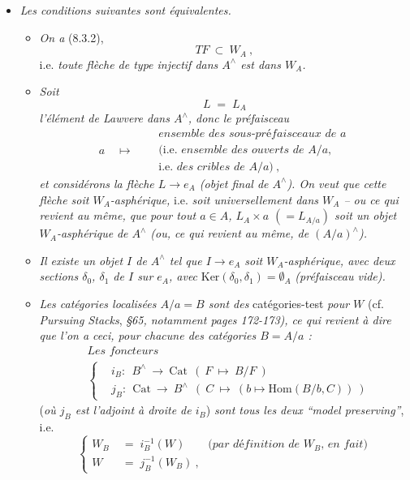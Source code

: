 \documentclass[11pt]{article}
\newcommand{\msp}[1]{\marginpar{\footnotesize [#1]}}
\newcommand{\Cat}{\mathrm{Cat}}
\newcommand{\chap}{^{\wedge}}
\begin{document}
\begin{itemize}[leftmargin=*]
\item[1$^\circ$)] \textit{Les conditions suivantes sont équivalentes.}
\begin{itemize}[leftmargin=*]
\item[a)] \textit{On a} (8.3.2),
\[
TF\ \subset\ W_A\ ,
\]
i.e. \textit{toute flèche de type injectif dans $A\chap$ est dans $W_A$.}
\item[b)] \textit{Soit}
\[
L \;=\; L_A
\tag*{(8.4.1)}
\]
\textit{l'élément de Lawvere dans $A\chap$, donc le préfaisceau}
\[
a \quad\longmapsto\quad
\begin{aligned}
&\textit{ensemble des sous-préfaisceaux de $a$}\\
&(\text{i.e. }\textit{ensemble des ouverts de $A/a$},\\
&\text{i.e. }\textit{des cribles de $A/a$})\ ,
\end{aligned}
\]
\textit{et considérons la flèche $L\longrightarrow e_A$ (objet final de $A\chap$). On veut que cette flèche soit $W_A$-asphérique,} i.e. \textit{soit universellement dans $W_A$ -- ou ce qui revient au même, que pour tout $a\in A$, $L_A\times a$ $(=L_{A/a})$ soit un objet $W_A$-asphérique}
\msp{page 106}
\textit{de $A\chap$ (ou, ce qui revient au même, de $(A/a)\chap$).}
\item[c)] \textit{Il existe un objet $I$ de $A\chap$ tel que $I\longrightarrow e_A$ soit $W_A$-asphérique, avec deux sections $\delta_0$, $\delta_1$ de $I$ sur $e_A$, avec} $\mathrm{Ker}(\delta_0,\delta_1)=\emptyset_A$ \textit{(préfaisceau vide).}
\item[d)] \textit{Les catégories localisées $A/a=B$ sont des} catégories-test \textit{pour $W$} (cf. \textit{Pursuing Stacks}, \textit{§65, notamment pages 172-173), ce qui revient à dire que l'on a ceci, pour chacune des catégories $B=A/a$ :}
\[
\begin{aligned}
&\textit{Les foncteurs}\\
&\left\{
\begin{aligned}
&i_B:\ \ B\chap \ \longrightarrow\ \Cat\ \ (\ F\ \longmapsto\ B/F\ )\\
&j_B:\ \ \Cat\ \longrightarrow\ B\chap\ \ (\ C\ \longmapsto\ (b\longmapsto \mathrm{Hom}(B/b,C))\ )
\end{aligned}
\right.
\end{aligned}
\tag*{(8.4.2)}
\]
(\textit{où $j_B$ est l'adjoint à droite de $i_B$}) \textit{sont tous les deux ``model preserving''}, i.e.
\[
\left\{
\begin{aligned}
W_B \;&=\; i_B^{-1}(W) \qquad \textit{(par définition de $W_B$, en fait)}\\
W \;&=\; j_B^{-1}(W_B)\ ,
\end{aligned}
\right.
\tag*{(8.4.3)}
\]
\end{itemize}
\end{itemize}
\end{document}
